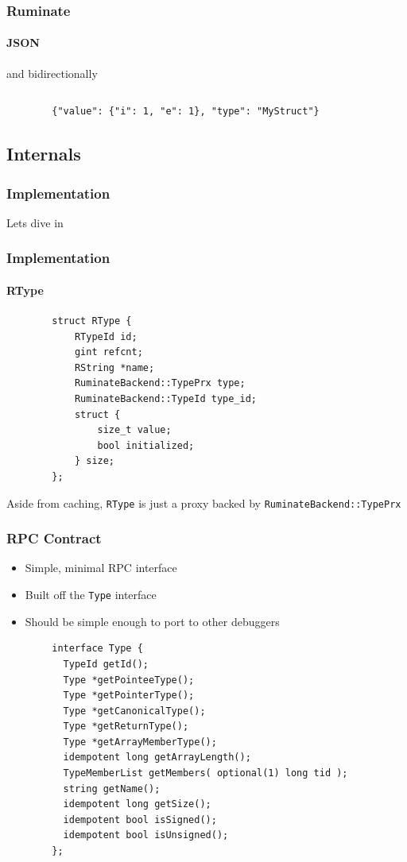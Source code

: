 \documentclass{beamer}
\begin{document}
\begin{frame}
	\frametitle{Ruminate}
	\framesubtitle{JSON}

	and bidirectionally

	\inputminted[tabsize=4,linenos]{c}{ruminate_jansson_bidi.c}

	\begin{Verbatim}
		{"value": {"i": 1, "e": 1}, "type": "MyStruct"}
	\end{Verbatim}
\end{frame}

\subsection{Internals}

\begin{frame}
	\frametitle{Implementation}

	Lets dive in
\end{frame}

\begin{frame}[fragile]
	\frametitle{Implementation}
	\framesubtitle{RType}

	\begin{verbatim}
		struct RType {
		    RTypeId id;
		    gint refcnt;
		    RString *name;
		    RuminateBackend::TypePrx type;
		    RuminateBackend::TypeId type_id;
		    struct {
		        size_t value;
		        bool initialized;
		    } size;
		};
	\end{verbatim}

	\pause

	Aside from caching, \lstinline|RType| is just a proxy backed by
	\lstinline|RuminateBackend::TypePrx|
\end{frame}

\begin{frame}
	\frametitle{RPC Contract}

	\begin{itemize}
		\item Simple, minimal RPC interface
		\item Built off the \lstinline|Type| interface
		\item Should be simple enough to port to other debuggers
	\end{itemize}

	\pause

	\begin{verbatim}
		interface Type {
		  TypeId getId();
		  Type *getPointeeType();
		  Type *getPointerType();
		  Type *getCanonicalType();
		  Type *getReturnType();
		  Type *getArrayMemberType();
		  idempotent long getArrayLength();
		  TypeMemberList getMembers( optional(1) long tid );
		  string getName();
		  idempotent long getSize();
		  idempotent bool isSigned();
		  idempotent bool isUnsigned();
		};
	\end{verbatim}
\end{frame}
\end{document}
